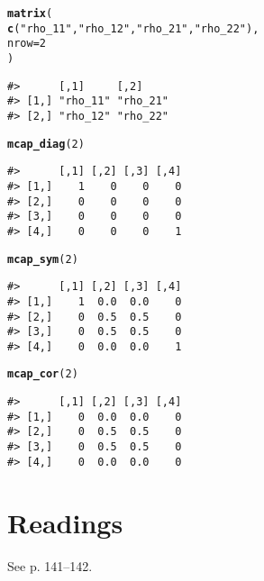 \documentclass{article}\usepackage[]{graphicx}\usepackage[]{color}
\makeatletter
\newcommand{\hlnum}[1]{\textcolor[rgb]{0.686,0.059,0.569}{#1}}%
\newcommand{\hlstr}[1]{\textcolor[rgb]{0.192,0.494,0.8}{#1}}%
\newcommand{\hlstd}[1]{\textcolor[rgb]{0.345,0.345,0.345}{#1}}%
\newcommand{\hlkwc}[1]{\textcolor[rgb]{0.333,0.667,0.333}{#1}}%
\newcommand{\hlkwd}[1]{\textcolor[rgb]{0.737,0.353,0.396}{\textbf{#1}}}%
\newenvironment{kframe}{%
 \def\at@end@of@kframe{}%
 \ifinner\ifhmode%
  \def\at@end@of@kframe{\end{minipage}}%
  \begin{minipage}{\columnwidth}%
 \fi\fi%
 \def\FrameCommand##1{\hskip\@totalleftmargin \hskip-\fboxsep
 \colorbox{shadecolor}{##1}\hskip-\fboxsep
     \hskip-\linewidth \hskip-\@totalleftmargin \hskip\columnwidth}%
 \MakeFramed {\advance\hsize-\width
   \@totalleftmargin\z@ \linewidth\hsize
   \@setminipage}}%
 {\par\unskip\endMakeFramed%
 \at@end@of@kframe}
\newenvironment{knitrout}{}{} %
\makeatother
\begin{document}
\begin{knitrout}
\color{fgcolor}\begin{kframe}
\begin{alltt}
\hlkwd{matrix}\hlstd{(}
  \hlkwd{c}\hlstd{(}\hlstr{"rho_11"}\hlstd{,} \hlstr{"rho_12"}\hlstd{,} \hlstr{"rho_21"}\hlstd{,} \hlstr{"rho_22"}\hlstd{),}
  \hlkwc{nrow} \hlstd{=} \hlnum{2}
\hlstd{)}
\end{alltt}
\begin{verbatim}
#>      [,1]     [,2]    
#> [1,] "rho_11" "rho_21"
#> [2,] "rho_12" "rho_22"
\end{verbatim}
\begin{alltt}
\hlkwd{mcap_diag}\hlstd{(}\hlnum{2}\hlstd{)}
\end{alltt}
\begin{verbatim}
#>      [,1] [,2] [,3] [,4]
#> [1,]    1    0    0    0
#> [2,]    0    0    0    0
#> [3,]    0    0    0    0
#> [4,]    0    0    0    1
\end{verbatim}
\begin{alltt}
\hlkwd{mcap_sym}\hlstd{(}\hlnum{2}\hlstd{)}
\end{alltt}
\begin{verbatim}
#>      [,1] [,2] [,3] [,4]
#> [1,]    1  0.0  0.0    0
#> [2,]    0  0.5  0.5    0
#> [3,]    0  0.5  0.5    0
#> [4,]    0  0.0  0.0    1
\end{verbatim}
\begin{alltt}
\hlkwd{mcap_cor}\hlstd{(}\hlnum{2}\hlstd{)}
\end{alltt}
\begin{verbatim}
#>      [,1] [,2] [,3] [,4]
#> [1,]    0  0.0  0.0    0
#> [2,]    0  0.5  0.5    0
#> [3,]    0  0.5  0.5    0
#> [4,]    0  0.0  0.0    0
\end{verbatim}
\end{kframe}
\end{knitrout}

\newpage

\section*{Readings}

See \Textcite{Nel-1985} p. 141--142.

\nocite{R-2021}

\printbibliography
\end{document}
